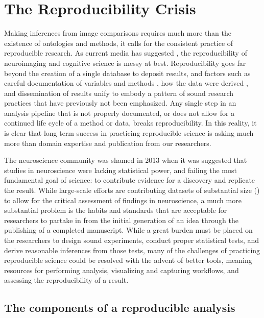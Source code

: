 \documentclass{report}
\begin{document}
\section{The Reproducibility Crisis}

Making inferences from image comparisons requires much more than the
existence of ontologies and methods, it calls for the consistent
practice of reproducible research. As current media has suggested \cite{Baker_undated-bx,Open_Science_Collaboration2015-hb,Open_Science_Collaboration2012-zr},
the reproducibility of neuroimaging and cognitive science is messy at
best. Reproducibility goes far beyond the creation of a single database
to deposit results, and factors such as careful documentation of
variables and methods \cite{Crook2013-fe,Chirigati2013-qw},
how the data were derived \cite{noauthor_2014-zc,Stodden2014-ca,Wandell2015-yt},
and dissemination of results \cite{Nichols2015-um,Stodden2014-ca} unify
to embody a pattern of sound research practices that have previously not
been emphasized. Any single step in an analysis pipeline that is not
properly documented, or does not allow for a continued life cycle of a
method or data, breaks reproducibility. In this reality, it is clear
that long term success in practicing reproducible science is asking much
more than domain expertise and publication from our researchers.

The neuroscience community was shamed in 2013 when it was suggested
 \cite{Button2013-ja} that studies in neuroscience were lacking statistical power, and failing the
most fundamental goal of science: to contribute evidence for a discovery
and replicate the result. While large-scale efforts are contributing
datasets of substantial size (\cite{Gorgolewski2015-gu,Van_Essen2013-fi}) to
allow for the critical assessment of findings in neuroscience, a much
more substantial problem is the habits and standards that are acceptable
for researchers to partake in from the initial generation of an idea
through the publishing of a completed manuscript. While a great burden
must be placed on the researchers to design sound experiments, conduct
proper statistical tests, and derive reasonable inferences from those
tests, many of the challenges of practicing reproducible science could
be resolved with the advent of better tools, meaning resources for
performing analysis, visualizing and capturing workflows, and assessing
the reproducibility of a result.

\subsection{The components of a reproducible analysis}
\end{document}
